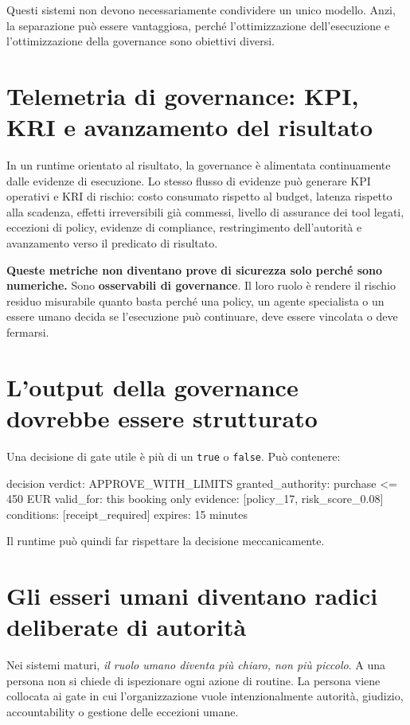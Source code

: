 \documentclass[10pt,oneside,openany]{book}
\newcommand{\term}[1]{\textbf{#1}}
\newcommand{\mono}[1]{\texttt{#1}}
\begin{document}
Questi sistemi non devono necessariamente condividere un unico modello. Anzi, la separazione può essere vantaggiosa, perché l'ottimizzazione dell'esecuzione e l'ottimizzazione della governance sono obiettivi diversi.

\section{Telemetria di governance: KPI, KRI e avanzamento del risultato}
In un runtime orientato al risultato, la governance è alimentata continuamente dalle evidenze di esecuzione. Lo stesso flusso di evidenze può generare KPI operativi e KRI di rischio: costo consumato rispetto al budget, latenza rispetto alla scadenza, effetti irreversibili già commessi, livello di assurance dei tool legati, eccezioni di policy, evidenze di compliance, restringimento dell'autorità e avanzamento verso il predicato di risultato.

\textbf{Queste metriche non diventano prove di sicurezza solo perché sono numeriche.} Sono \term{osservabili di governance}. Il loro ruolo è rendere il rischio residuo misurabile quanto basta perché una policy, un agente specialista o un essere umano decida se l'esecuzione può continuare, deve essere vincolata o deve fermarsi.

\section{L'output della governance dovrebbe essere strutturato}
Una decisione di gate utile è più di un \mono{true} o \mono{false}. Può contenere:

\begin{codeblock}
decision {
  verdict: APPROVE_WITH_LIMITS
  granted_authority: purchase <= 450 EUR
  valid_for: this booking only
  evidence: [policy_17, risk_score_0.08]
  conditions: [receipt_required]
  expires: 15 minutes
}
\end{codeblock}

Il runtime può quindi far rispettare la decisione meccanicamente.

\section{Gli esseri umani diventano radici deliberate di autorità}
Nei sistemi maturi, \emph{il ruolo umano diventa più chiaro, non più piccolo}. A una persona non si chiede di ispezionare ogni azione di routine. La persona viene collocata ai gate in cui l'organizzazione vuole intenzionalmente autorità, giudizio, accountability o gestione delle eccezioni umane.
\end{document}
